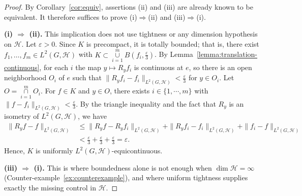 \documentclass[11pt]{amsart}
\def\union{\mathop{\cup }}
\def\inter{\mathop{\cap }}
\begin{document}
\begin{proof}
By Corollary~\ref{cor:equiv}, assertions (ii) and (iii) are already known to be equivalent. It
therefore suffices to prove (i)$\Rightarrow$(ii) and (iii)$\Rightarrow$(i).

\medskip
\noindent\textbf{(i) $\Rightarrow$ (ii).}
This implication does not use tightness or any dimension hypothesis on $\mathcal{H}$. Let $\varepsilon>0$. Since $K$ is precompact, it is totally bounded; that is,  there exist
$f_1,\dots,f_m\in L^2(G,\mathcal{H})$ with $K\subset\union\limits_{i=1}^mB(f_i,\frac{\varepsilon}{3})$. By
Lemma~\ref{lemma:translation-continuous}, for each $i$ the map $y\mapsto R_yf_i$
is continuous at $e$, so there is an open neighborhood $O_i$ of $e$ such that
$\|R_yf_i-f_i\|_{L^2(G,\mathcal{H})}<\frac{\varepsilon}{3}$ for $y\in O_i$. Let $O=\inter\limits_{i=1}^mO_i$.
For $f\in K$ and $y\in O$, there exists $i\in\{1,\cdots,m\}$ with $\|f-f_i\|_{L^2(G,\mathcal{H})}<\frac{\varepsilon}{3}$.
By the triangle inequality and the fact  that $R_y$ is an isometry of $L^2(G,\mathcal{H})$, we have
\begin{align*}
\|R_yf-f\|_{L^2(G,\mathcal{H})}&\le\|R_yf-R_yf_i\|_{L^2(G,\mathcal{H})}+\|R_yf_i-f_i\|_{L^2(G,\mathcal{H})}+
\|f_i-f\|_{L^2(G,\mathcal{H})}\\
&<\frac{\varepsilon}{3}+\frac{\varepsilon}{3}+\frac{\varepsilon}{3}=\varepsilon.
\end{align*}
Hence, $K$ is uniformly $L^2(G,\mathcal{H})$-equicontinuous.

\medskip
\noindent\textbf{(iii) $\Rightarrow$ (i).}
This is where boundedness alone is not enough when $\dim\mathcal{H}=\infty$
(Counter-example~\ref{ex:counterexample}), and where uniform tightness supplies exactly the missing control in $\mathcal{H}$.


\end{proof}
\end{document}
